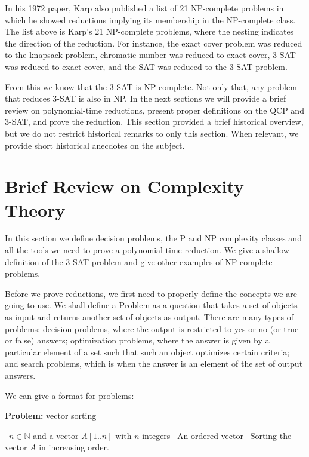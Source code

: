 \documentclass{amsart}
\theoremstyle{plain}
\begin{document}
In his 1972 paper, Karp also published a list of 21 NP-complete problems in which he showed
reductions implying its membership in the NP-complete class. The list above is Karp's 21
NP-complete problems, where the nesting indicates the direction of the reduction. For instance, the
exact cover problem was reduced to the knapsack problem, chromatic number was reduced to exact
cover, 3-SAT was reduced to exact cover, and the SAT was reduced to the 3-SAT problem.

From this we know that the 3-SAT is NP-complete. Not only that, any problem that reduces 3-SAT is
also in NP\@. In the next sections we will provide a brief review on polynomial-time reductions,
present proper definitions on the QCP and 3-SAT, and prove the reduction. This section provided a
brief historical overview, but we do not restrict historical remarks to only this section. When
relevant, we provide short historical anecdotes on the subject.

\section{Brief Review on Complexity Theory}

In this section we define decision problems, the P and NP complexity classes and all the tools we
need to prove a polynomial-time reduction. We give a shallow definition of the 3-SAT problem and
give other examples of NP-complete problems.

Before we prove reductions, we first need to properly define the concepts we are going to use. We
shall define a Problem as a question that takes a set of objects as input and returns another set
of objects as output. There are many types of problems: decision problems, where the output is
restricted to yes or no (or true or false) answers; optimization problems, where the answer is
given by a particular element of a set such that such an object optimizes certain criteria; and
search problems, which is when the answer is an element of the set of output answers.

We can give a format for problems:

\begin{algorithm}[h]
  \caption*{\textbf{Problem:} vector sorting}
  \begin{algorithmic}[1]
    \Require\, $n\in\mathbb{N}$ and a vector $A[1..n]$ with $n$ integers
    \Ensure\, An ordered vector
    \Description\, Sorting the vector $A$ in increasing order.
  \end{algorithmic}
\end{algorithm}
\end{document}
